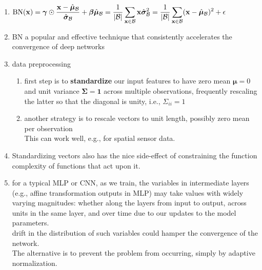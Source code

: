 \begin{enumerate}[itemsep=0.1cm]
    \item[] 
    $
        \hfill
        \textrm{BN}(\mathbf{x}) = \boldsymbol{\gamma} \odot \dfrac{\mathbf{x} - \hat{\boldsymbol{\mu}}_\mathcal{B}}{\hat{\boldsymbol{\sigma}}_\mathcal{B}} + \boldsymbol{\beta}
        \hfill
        \hat{\boldsymbol{\mu}}_\mathcal{B} = \dfrac{1}{|\mathcal{B}|} \dsum_{\mathbf{x} \in \mathcal{B}} \mathbf{x}
        \hfill
        \hat{\boldsymbol{\sigma}}_\mathcal{B}^2 = \dfrac{1}{|\mathcal{B}|} \dsum_{\mathbf{x} \in \mathcal{B}} (\mathbf{x} - \hat{\boldsymbol{\mu}}_{\mathcal{B}})^2 + \epsilon
        \hfill
    $

    \item BN a popular and effective technique that consistently accelerates the convergence of deep networks

    \item data preprocessing
    \begin{enumerate}
        \item first step is to \textbf{standardize} our input features to have zero mean $\boldsymbol{\mu} = 0$ and unit variance $\boldsymbol{\Sigma} = \boldsymbol{1}$ across multiple observations, frequently rescaling the latter so that the diagonal is unity, i.e., $\Sigma_{ii} = 1$

        \item another strategy is to rescale vectors to unit length, possibly zero mean per observation\\
        This can work well, e.g., for spatial sensor data.

    \end{enumerate}

    \item Standardizing vectors also has the nice side-effect of constraining the function complexity of functions that act upon it.

    \item for a typical MLP or CNN, as we train, the variables in intermediate layers (e.g., affine transformation outputs in MLP) may take values with widely varying magnitudes: whether along the layers from input to output, across units in the same layer, and over time due to our updates to the model parameters.\\
    drift in the distribution of such variables could hamper the convergence of the network.\\
    The alternative is to prevent the problem from occurring, simply by adaptive normalization.


\end{enumerate}
